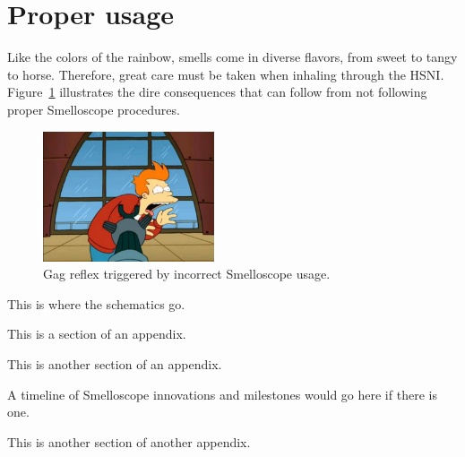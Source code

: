 \documentclass[singlespace]{../unmthesis}
\begin{document}
\section{Proper usage}\label{sec:usage}

Like the colors of the rainbow, smells come in diverse flavors, from sweet to tangy to horse. 
Therefore, great care must be taken when inhaling through the HSNI. Figure~\ref{fig:smelloscope04} 
illustrates the dire consequences that can follow from not following proper Smelloscope procedures.

\begin{figure}[ht]
\centering
\includegraphics[width=0.45\textwidth]{./figures/smelloscope04}
\caption{Gag reflex triggered by incorrect Smelloscope usage.}
\label{fig:smelloscope04}
\end{figure}


%
%
%
%
%
\appendixstart

This is where the schematics go.

{}
This is a section of an appendix.


This is another section of an appendix.


A timeline of Smelloscope innovations and milestones would go here if there is one.


This is another section of another appendix.

\appendixend


%
%

\end{document}
